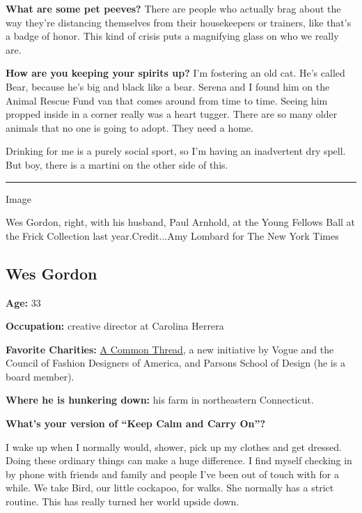\textbf{What are some pet peeves?} There are people who actually brag
about the way they're distancing themselves from their housekeepers or
trainers, like that's a badge of honor. This kind of crisis puts a
magnifying glass on who we really are.

\textbf{How are you keeping your spirits up?} I'm fostering an old cat.
He's called Bear, because he's big and black like a bear. Serena and I
found him on the Animal Rescue Fund van that comes around from time to
time. Seeing him propped inside in a corner really was a heart tugger.
There are so many older animals that no one is going to adopt. They need
a home.

Drinking for me is a purely social sport, so I'm having an inadvertent
dry spell. But boy, there is a martini on the other side of this.

\begin{center}\rule{0.5\linewidth}{\linethickness}\end{center}

Image

Wes Gordon, right, with his husband, Paul Arnhold, at the Young Fellows
Ball at the Frick Collection last year.Credit...Amy Lombard for The New
York Times

\hypertarget{wes-gordon}{%
\subsection{Wes Gordon}\label{wes-gordon}}

\textbf{Age:} 33

\textbf{Occupation:} creative director at Carolina Herrera

\textbf{Favorite Charities:}
\href{https://www.nytimes.com/2020/03/24/style/coronavirus-fashion-rescue-plan.html}{A
Common Thread}, a new initiative by Vogue and the Council of Fashion
Designers of America, and Parsons School of Design (he is a board
member).

\textbf{Where he is hunkering down:} his farm in northeastern
Connecticut.

\textbf{What's your version of ``Keep Calm and Carry On''?}

I wake up when I normally would, shower, pick up my clothes and get
dressed. Doing these ordinary things can make a huge difference. I find
myself checking in by phone with friends and family and people I've been
out of touch with for a while. We take Bird, our little cockapoo, for
walks. She normally has a strict routine. This has really turned her
world upside down.

